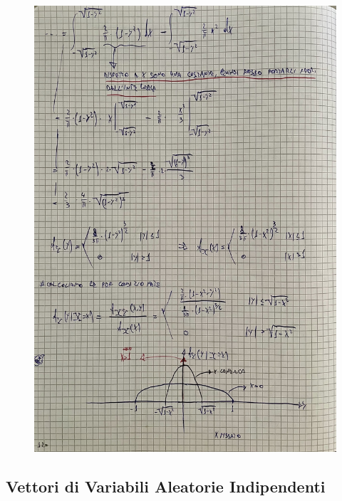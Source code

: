 \documentclass{article}
\begin{document}
\begin{figure}[H]
\centering
\includegraphics[scale=0.14]{ese/44a.jpeg}
\end{figure} 

\subsection{Vettori di Variabili Aleatorie Indipendenti}
\end{document}
